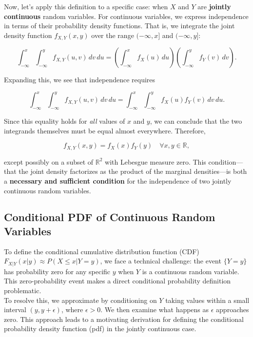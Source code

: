 Now, let's apply this definition to a specific case: when \( X \) and \( Y \) are \textbf{jointly continuous} random variables. For continuous variables, we express independence in terms of their probability density functions. That is, we integrate the joint density function \( f_{X,Y}(x, y) \) over the range \((-\infty, x]\) and \((-\infty, y]\):

\[
\int_{-\infty}^{x} \int_{-\infty}^{y} f_{X,Y}(u, v) \, dv \, du = 
\left( \int_{-\infty}^{x} f_X(u) \, du \right) \left( \int_{-\infty}^{y} f_Y(v) \, dv \right).
\]

Expanding this, we see that independence requires

\[
\int_{-\infty}^{x} \int_{-\infty}^{y} f_{X,Y}(u, v) \, dv \, du = \int_{-\infty}^{x} \int_{-\infty}^{y} f_X(u) f_Y(v) \, dv \, du.
\]

Since this equality holds for \textit{all} values of \( x \) and \( y \), we can conclude that the two integrands themselves must be equal almost everywhere. Therefore,

\[
f_{X,Y}(x, y) = f_X(x) f_Y(y) \quad \forall x, y \in \mathbb{R},
\]

except possibly on a subset of \( \mathbb{R}^2 \) with Lebesgue measure zero. This condition—that the joint density factorizes as the product of the marginal densities—is both a \textbf{necessary and sufficient condition} for the independence of two jointly continuous random variables.

\subsection{Conditional PDF of Continuous Random Variables}

To define the conditional cumulative distribution function (CDF) \( F_{X|Y}(x | y) \approx P(X \leq x | Y = y) \), we face a technical challenge: the event \( \{ Y = y \} \) has probability zero for any specific \( y \) when \( Y \) is a continuous random variable. This zero-probability event makes a direct conditional probability definition problematic.\\

To resolve this, we approximate by conditioning on \( Y \) taking values within a small interval \( (y, y + \epsilon) \), where \( \epsilon > 0 \). We then examine what happens as \( \epsilon \) approaches zero. This approach leads to a motivating derivation for defining the conditional probability density function (pdf) in the jointly continuous case.\\

